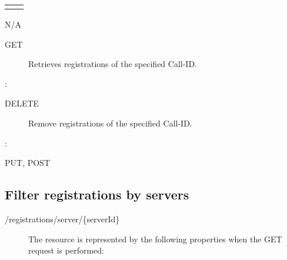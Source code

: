 \documentclass[letterpaper,10pt,english]{sphinxmanual}
\begin{document}
\begin{savenotes}\sphinxattablestart
\centering
\begin{tabulary}{\linewidth}[t]{|T|T|}
\hline

&
\\
\hline&\\
\hline
\end{tabulary}
\par
\sphinxattableend\end{savenotes}

 N/A
\begin{description}
\item[{ GET}] \leavevmode
Retrieves registrations of the specified Call-ID.

\end{description}

:

\begin{sphinxVerbatim}[commandchars=\\\{\}]
\end{sphinxVerbatim}
\begin{description}
\item[{ DELETE}] \leavevmode
Remove registrations of the specified Call-ID.

\end{description}

:

\begin{sphinxVerbatim}[commandchars=\\\{\}]
\end{sphinxVerbatim}

 PUT, POST


\subsection{Filter registrations by servers}
\label{\detokenize{restapi:filter-registrations-by-servers}}
 /registrations/server/\{serverId\}
\begin{description}
\item[{}] \leavevmode
The resource is represented by the following properties when the GET request is performed:

\end{description}
\end{document}
